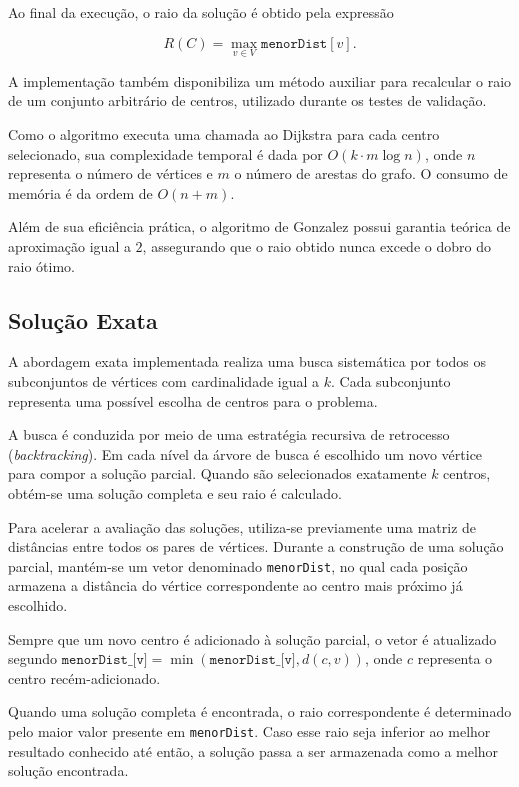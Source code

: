 \documentclass[12pt]{article}
\begin{document}
Ao final da execução, o raio da solução é obtido pela expressão 

\[
R(C)=\max_{v \in V} \texttt{menorDist}[v].
\]

A implementação também disponibiliza um método auxiliar para recalcular o raio de um conjunto arbitrário de centros, utilizado durante os testes de validação.

Como o algoritmo executa uma chamada ao Dijkstra para cada centro selecionado, sua complexidade temporal é dada por $O(k \cdot m \log n)$, onde $n$ representa o número de vértices e $m$ o número de arestas do grafo. O consumo de memória é da ordem de $O(n+m)$.

Além de sua eficiência prática, o algoritmo de Gonzalez possui garantia teórica de aproximação igual a $2$, assegurando que o raio obtido nunca excede o dobro do raio ótimo.

\subsection{Solução Exata}

A abordagem exata implementada realiza uma busca sistemática por todos os subconjuntos de vértices com cardinalidade igual a $k$. Cada subconjunto representa uma possível escolha de centros para o problema.

A busca é conduzida por meio de uma estratégia recursiva de retrocesso (\textit{backtracking}). Em cada nível da árvore de busca é escolhido um novo vértice para compor a solução parcial. Quando são selecionados exatamente $k$ centros, obtém-se uma solução completa e seu raio é calculado.

Para acelerar a avaliação das soluções, utiliza-se previamente uma matriz de distâncias entre todos os pares de vértices. Durante a construção de uma solução parcial, mantém-se um vetor denominado \texttt{menorDist}, no qual cada posição armazena a distância do vértice correspondente ao centro mais próximo já escolhido.

Sempre que um novo centro é adicionado à solução parcial, o vetor é atualizado segundo $\texttt{menorDist\_[v]} = \min(\texttt{menorDist\_[v]}, d(c,v))$, onde $c$ representa o centro recém-adicionado.

Quando uma solução completa é encontrada, o raio correspondente é determinado pelo maior valor presente em \texttt{menorDist}. Caso esse raio seja inferior ao melhor resultado conhecido até então, a solução passa a ser armazenada como a melhor solução encontrada.
\end{document}
